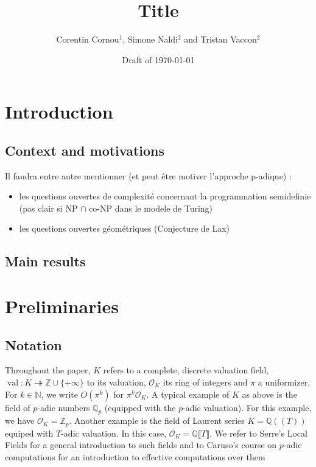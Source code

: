 \documentclass[a4paper,12pt]{article}
\title{\bf Title}
\newcommand{\N}{\mathbb{N}} %
\DeclareMathOperator{\val}{val}
\def\QQ{\ensuremath{\mathbb{Q}}}
\def\ZZ{\ensuremath{\mathbb{Z}}}
\newcommand{\OK}{\mathcal{O}_K}
\begin{document}
\author{Corentin Cornou$^{1}$, Simone Naldi$^2$ and Tristan Vaccon$^2$}


\date{Draft of \today}

\maketitle

\begin{abstract}
\end{abstract}


\tableofcontents


\section{Introduction}

\subsection{Context and motivations}

Il faudra entre autre mentionner (et peut être motiver l'approche p-adique) :
\begin{itemize}
\item les questions ouvertes de complexité concernant la programmation semidefinie (pas clair si NP $\cap$ co-NP
  dans le modele de Turing)
\item les questions ouvertes géométriques (Conjecture de Lax)
\end{itemize}


\subsection{Main results}



\section{Preliminaries}

\subsection{Notation}

Throughout the paper, $K$ refers to a complete,
discrete valuation field, $\val : K \twoheadrightarrow \ZZ \cup \{+\infty\}$ to its valuation,
$\OK$ its ring of integers and $\pi$ a uniformizer.
For $k \in \N$, we write $O(\pi^k)$ for $\pi^k \OK.$
A typical example of $K$ as above is the field of $p$-adic numbers 
$\QQ_p$ (equipped with the $p$-adic valuation). For this example, we 
have $\OK = \ZZ_p$.
Another example is the field of Laurent series
$K=\QQ ((T))$ equiped with $T$-adic valuation.
In this case,  $\OK = \QQ \llbracket T \rrbracket$.
We refer to Serre's Local Fields \cite{Serre} for a
general introduction to such fields
and to Caruso's course on $p$-adic computations \cite{caruso_computations_2017}
for an introduction to effective computations
over them
\end{document}

